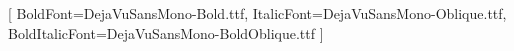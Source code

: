 \setmonofont{DejaVuSansMono.ttf}[
  BoldFont=DejaVuSansMono-Bold.ttf,
  ItalicFont=DejaVuSansMono-Oblique.ttf,
  BoldItalicFont=DejaVuSansMono-BoldOblique.ttf
]

\providecommand{\bibsection}{}
\renewcommand{\bibsection}{}

\usepackage{seqsplit}

\setlength{\emergencystretch}{3em}

\makeatletter
\renewcommand{\@pnumwidth}{2.7em}
\renewcommand{\@tocrmarg}{3.7em}
\renewcommand*{\l@section}{\@dottedtocline{1}{1.5em}{3.6em}}
\renewcommand*{\l@subsection}{\@dottedtocline{2}{5.1em}{4.8em}}
\renewcommand*{\l@subsubsection}{\@dottedtocline{3}{9.9em}{5.6em}}
\makeatother
